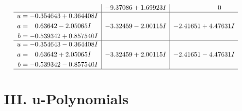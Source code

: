 \documentclass[1p]{elsarticle_modified}
\theoremstyle{definition}
\begin{document}
$$\begin{array}{c|c|c}
 & -9.37086 + 1.69923 I & \phantom{-0.000000 } 0 \\ \hline\begin{aligned}
u &= -0.354643 + 0.364408 I \\
a &= \phantom{-}0.63642 - 2.05065 I \\
b &= -0.539342 + 0.857540 I\end{aligned}
 & -3.32459 - 2.00115 I & -2.41651 + 4.47631 I \\ \hline\begin{aligned}
u &= -0.354643 - 0.364408 I \\
a &= \phantom{-}0.63642 + 2.05065 I \\
b &= -0.539342 - 0.857540 I\end{aligned}
 & -3.32459 + 2.00115 I & -2.41651 - 4.47631 I\\
 \hline 
 \end{array}$$\newpage
\newpage\renewcommand{\arraystretch}{1}
\centering \section*{ III. u-Polynomials}
\end{document}
